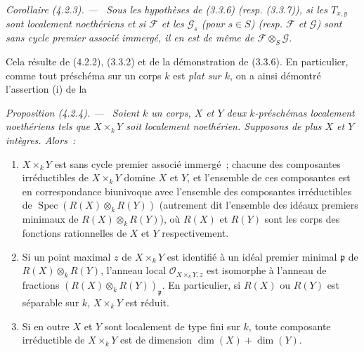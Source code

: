 \documentclass[10pt,oneside]{book}
\newcommand{\oldpage}[2][]{%
  \setcounter{footnote}{0}%
  \marginpar{\scriptsize\textbf{#1}~|~#2}\ignorespaces}
\newenvironment{proposition}[1][]{%
  \par\medskip\noindent\itshape Proposition (#1). ---\ }{\par}
\newenvironment{corollary}[1][]{%
  \par\medskip\noindent\itshape Corollaire (#1). ---\ }{\par}
\begin{document}
\begin{corollary}[4.2.3]
\label{IV.2.4.2.3-fr}
Sous les hypothèses de (3.3.6) (resp. (3.3.7)), si les $T_{x,y}$ sont
localement noethériens et si $\mathcal F$ et les $\mathcal G_s$ (pour $s\in S$)
(resp. $\mathcal F$ et $\mathcal G$) sont sans cycle premier associé immergé,
il en est de même de $\mathcal F\otimes_S\mathcal G$.
\end{corollary}

Cela résulte de (4.2.2), (3.3.2) et de la démonstration de (3.3.6). En
particulier, comme tout préschéma sur un corps $k$ est \emph{plat sur $k$}, on
a ainsi démontré l'assertion (i) de la

\begin{proposition}[4.2.4]
\label{IV.2.4.2.4-fr}
Soient $k$ un corps, $X$ et $Y$ deux $k$-préschémas localement noethériens
tels que $X\times_k Y$ soit localement noethérien. Supposons de plus $X$ et
$Y$ intègres. Alors~:
\begin{enumerate}
\item[(i)] $X\times_k Y$ est sans cycle premier associé immergé~; chacune des
composantes irréductibles de $X\times_k Y$ domine $X$ et $Y$, et l'ensemble de
ces composantes est en correspondance biunivoque avec l'ensemble des
composantes irréductibles de
$\operatorname{Spec}(R(X)\otimes_k R(Y))$ (autrement dit l'ensemble des
idéaux premiers minimaux de $R(X)\otimes_k R(Y)$), où $R(X)$ et $R(Y)$ sont
les corps des fonctions rationnelles de $X$ et $Y$ respectivement.
\item[(ii)] Si un point maximal $z$ de $X\times_k Y$ est identifié à un idéal
premier minimal $\mathfrak p$ de $R(X)\otimes_k R(Y)$, l'anneau local
$\mathcal O_{X\times_k Y,z}$ est isomorphe à l'anneau de fractions
$(R(X)\otimes_k R(Y))_{\mathfrak p}$. En particulier, si $R(X)$ ou $R(Y)$ est
séparable sur $k$, $X\times_k Y$ est réduit.

\oldpage[IV-2]{56}

\item[(iii)] Si en outre $X$ et $Y$ sont localement de type fini sur $k$,
toute composante irréductible de $X\times_k Y$ est de dimension
$\dim(X)+\dim(Y)$.
\end{enumerate}
\end{proposition}
\end{document}
